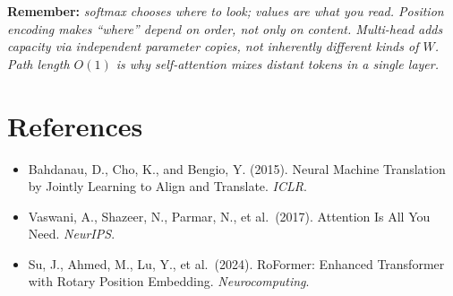 \documentclass[11pt]{article}
\begin{document}
\noindent\textbf{Remember:}
\emph{softmax chooses where to look; values are what you read. Position
encoding makes ``where'' depend on order, not only on content. Multi-head
adds capacity via independent parameter copies, not inherently different
kinds of \(W\). Path length \(O(1)\) is why self-attention mixes distant
tokens in a single layer.}

\section*{References}

\begin{itemize}[leftmargin=*]
  \item Bahdanau, D., Cho, K., and Bengio, Y. (2015).
        Neural Machine Translation by Jointly Learning to Align and
        Translate. \emph{ICLR}.
  \item Vaswani, A., Shazeer, N., Parmar, N., et al.\ (2017).
        Attention Is All You Need. \emph{NeurIPS}.
  \item Su, J., Ahmed, M., Lu, Y., et al.\ (2024).
        RoFormer: Enhanced Transformer with Rotary Position Embedding.
        \emph{Neurocomputing}.
\end{itemize}
\end{document}
